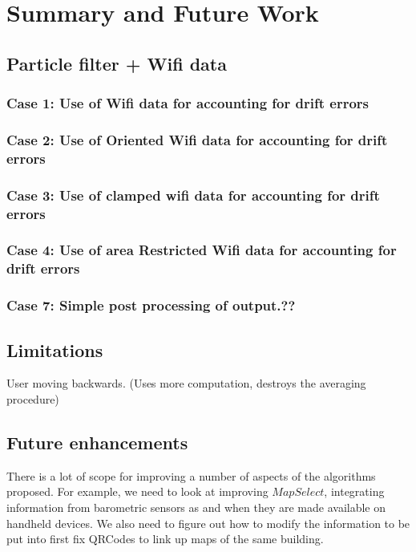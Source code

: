 \chapter{Summary and Future Work\label{chap:summary}}

\section{Particle filter + Wifi data}

\subsection{Case 1: Use of Wifi data for accounting for drift errors}
\subsection{Case 2: Use of Oriented Wifi data for accounting for drift errors}
\subsection{Case 3: Use of clamped wifi data for accounting for drift errors}
\subsection{Case 4: Use of area Restricted Wifi data for accounting for drift errors}
\subsection{Case 7: Simple post processing of output.??}


\section{Limitations}

User moving backwards. (Uses more computation, destroys the averaging procedure)


\section{Future enhancements}

There is a lot of scope for improving a number of aspects of the 
algorithms proposed. For example, we need to look at improving $MapSelect$,
integrating information from barometric sensors as and when they are made
available on handheld devices. We also need to figure out how to modify
the information to be put into first fix QRCodes to link up maps of 
the same building.

